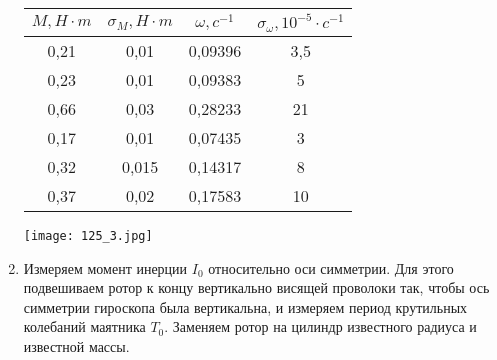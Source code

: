 \documentclass[a4paper, 12pt]{article}%
\begin{document}
\begin{enumerate}
\begin{center}
\begin{tabular}{|c|c|c|c|}
\hline
$M, H \cdot m$ & $\sigma_M, H \cdot m$ & $\omega, c^{-1}$ & $\sigma_{\omega}, 10^{-5} \cdot c^{-1}$ \\ \hline
0,21       & 0,01                  & 0,09396          & 3,5                                     \\ \hline
0,23       & 0,01                  & 0,09383          & 5                                     \\ \hline
0,66       & 0,03                  & 0,28233          & 21                                      \\ \hline
0,17      & 0,01                  & 0,07435          & 3                                       \\ \hline
0,32      & 0,015                 & 0,14317          & 8                                       \\ \hline
0,37      & 0,02                  & 0,17583          & 10                                      \\ \hline
\end{tabular}
\texttt{[image: 125\_3.jpg]}
\end{center}
\item Измеряем момент инерции $I_0$ относительно оси симметрии. Для этого подвешиваем ротор к концу вертикально висящей проволоки так, чтобы ось симметрии гироскопа была вертикальна, и измеряем период крутильных колебаний маятника $T_0$. Заменяем ротор на цилиндр известного радиуса и известной массы. 
\begin{center}


\end{center}
\end{enumerate}
\end{document}
